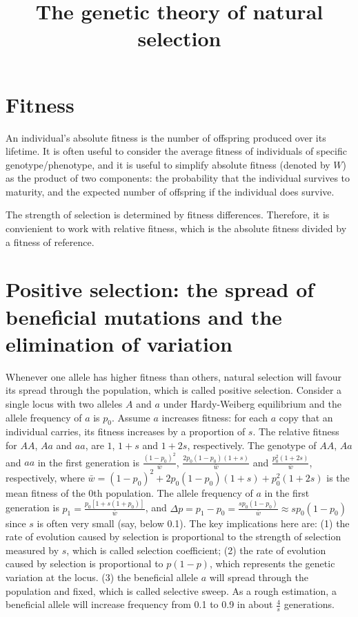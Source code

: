 \documentclass[11pt]{article}
\title{The genetic theory of natural selection}
\author{}
\date{}
\begin{document}
\begin{sloppypar}
  \maketitle

  \linenumbers

\section{Fitness}
An individual's absolute fitness is the number of offspring produced over its lifetime. 
It is often useful to consider the average fitness of individuals of specific genotype/phenotype, and it is useful to simplify  absolute fitness (denoted by $W$) as the product of two components: the probability that the individual survives to maturity, and the expected number of offspring if the individual does survive. 

\par

The strength of selection is determined by fitness differences. 
Therefore, it is convienient to work with relative fitness, which is the absolute fitness divided by a fitness of reference. 

\section{Positive selection: the spread of beneficial mutations and the elimination of variation}
Whenever one allele has higher fitness than others, natural selection will favour its spread through the population, which is called positive selection. 
Consider a single locus with two alleles $A$ and $a$ under Hardy-Weiberg equilibrium and the allele frequency of $a$ is $p_0$. 
Assume $a$ increases fitness: for each $a$ copy that an individual carries, its fitness increases by a proportion of $s$. 
The relative fitness for $AA$, $Aa$ and $aa$, are $1$, $1+s$ and $1+2s$, respectively. 
The genotype of $AA$, $Aa$ and $aa$ in the first generation is $\frac{(1-p_0)^2}{\bar{w}}$, $\frac{2p_0(1-p_0)(1+s)}{\bar{w}}$ and $\frac{p_0^2(1+2s)}{\bar{w}}$, respectively, where $\bar{w}=(1-p_0)^2+2p_0(1-p_0)(1+s)+p_0^2(1+2s)$ is the mean fitness of the 0th population. 
The allele frequency of $a$ in the first generation is $p_1=\frac{p_0[1+s(1+p_0)]}{\bar{w}}$, and $\Delta p=p_1-p_0=\frac{sp_0(1-p_0)}{\bar{w}} \approx sp_0(1-p_0)$ since $s$ is often very small (say, below 0.1). 
The key implications here are: 
(1) the rate of evolution caused by selection is proportional to the strength of selection measured by $s$, which is called selection coefficient; 
(2) the rate of evolution caused by selection is proportional to $p(1-p)$, which represents the genetic variation at the locus. 
(3) the beneficial allele $a$ will spread through the population and fixed, which is called selective sweep. 
As a rough estimation, a beneficial allele will increase frequency from 0.1 to 0.9 in about $\frac{4}{s}$ generations. 


\end{sloppypar}
\end{document}
